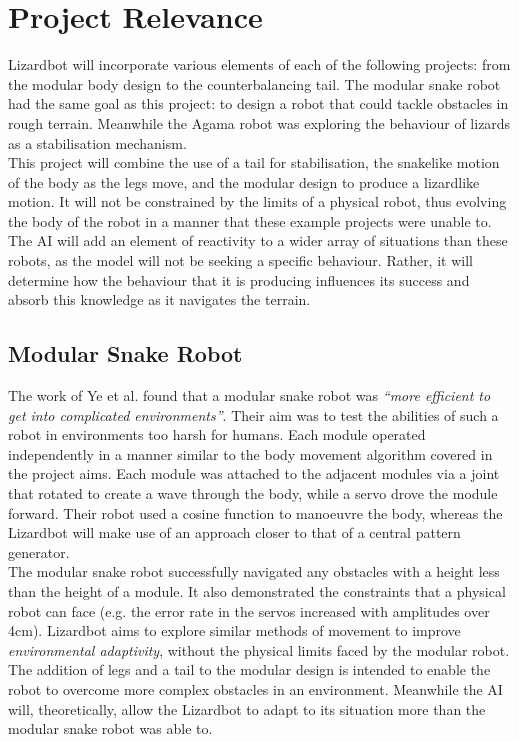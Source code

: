 \documentclass{article}
\begin{document}
\newpage
\section{Project Relevance}
Lizardbot will incorporate various elements of each of the following projects: from the modular body design to the counterbalancing tail. The modular snake robot had the same goal as this project: to design a robot that could tackle obstacles in rough terrain. Meanwhile the Agama robot was exploring the behaviour of lizards as a stabilisation mechanism.\\
This project will combine the use of a tail for stabilisation, the snakelike motion of the body as the legs move, and the modular design to produce a lizardlike motion. It will not be constrained by the limits of a physical robot, thus evolving the body of the robot in a manner that these example projects were unable to. The AI will add an element of reactivity to a wider array of situations than these robots, as the model will not be seeking a specific behaviour. Rather, it will determine how the behaviour that it is producing influences its success and absorb this knowledge as it navigates the terrain.
\subsection{Modular Snake Robot}
The work of Ye et al.  found that a modular snake robot was \textit{“more efficient to get into complicated environments”}. Their aim was to test the abilities of such a robot in environments too harsh for humans. Each module operated independently in a manner similar to the body movement algorithm covered in the project aims. Each module was attached to the adjacent modules via a joint that rotated to create a wave through the body, while a servo drove the module forward. Their robot used a cosine function to manoeuvre the body, whereas the Lizardbot will make use of an approach closer to that of a central pattern generator. \\
The modular snake robot successfully navigated any obstacles with a height less than the height of a module. It also demonstrated the constraints that a physical robot can face (e.g. the error rate in the servos increased with amplitudes over 4cm). Lizardbot aims to explore similar methods of movement to improve \textit{environmental adaptivity}, without the physical limits faced by the modular robot. The addition of legs and a tail to the modular design is intended to enable the robot to overcome more complex obstacles in an environment. Meanwhile the AI will, theoretically, allow the Lizardbot to adapt to its situation more than the modular snake robot was able to.
\end{document}
